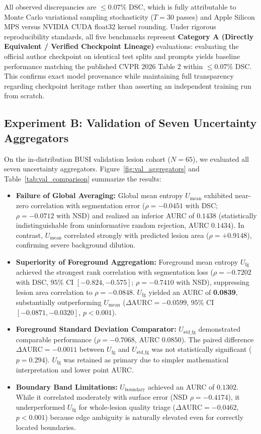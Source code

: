\documentclass[10pt,journal,compsoc]{IEEEtran}
\begin{document}
All observed discrepancies are $\le 0.07\%$ DSC, which is fully attributable to Monte Carlo variational sampling stochasticity ($T=30$ passes) and Apple Silicon MPS versus NVIDIA CUDA float32 kernel rounding. Under rigorous reproducibility standards, all five benchmarks represent \textbf{Category A (Directly Equivalent / Verified Checkpoint Lineage)} evaluations: evaluating the official author checkpoint on identical test splits and prompts yields baseline performance matching the published CVPR 2026 Table 2 within $\le 0.07\%$ DSC. This confirms exact model provenance while maintaining full transparency regarding checkpoint heritage rather than asserting an independent training run from scratch.

\subsection{Experiment B: Validation of Seven Uncertainty Aggregators}
On the in-distribution BUSI validation lesion cohort ($N=65$), we evaluated all seven uncertainty aggregators. Figure~\ref{fig:val_aggregators} and Table~\ref{tab:val_comparison} summarize the results:
\begin{itemize}
    \item \textbf{Failure of Global Averaging:} Global mean entropy $U_{\mathrm{mean}}$ exhibited near-zero correlation with segmentation error ($\rho = -0.0451$ with DSC; $\rho = -0.0712$ with NSD) and realized an inferior AURC of $0.1438$ (statistically indistinguishable from uninformative random rejection, AURC $0.1434$). In contrast, $U_{\mathrm{mean}}$ correlated strongly with predicted lesion area ($\rho = +0.9148$), confirming severe background dilution.
    \item \textbf{Superiority of Foreground Aggregation:} Foreground mean entropy $U_{\mathrm{fg}}$ achieved the strongest rank correlation with segmentation loss ($\rho = -0.7202$ with DSC, $95\%$ CI $[-0.824, -0.575]$; $\rho = -0.7410$ with NSD), suppressing lesion area correlation to $\rho = -0.0848$. $U_{\mathrm{fg}}$ yielded an AURC of \textbf{0.0839}, substantially outperforming $U_{\mathrm{mean}}$ ($\Delta\mathrm{AURC} = -0.0599$, $95\%$ CI $[-0.0871, -0.0320]$, $p < 0.001$).
    \item \textbf{Foreground Standard Deviation Comparator:} $U_{\mathrm{std\_fg}}$ demonstrated comparable performance ($\rho = -0.7068$, AURC $0.0850$). The paired difference $\Delta\mathrm{AURC} = -0.0011$ between $U_{\mathrm{fg}}$ and $U_{\mathrm{std\_fg}}$ was not statistically significant ($p = 0.294$). $U_{\mathrm{fg}}$ was retained as primary due to simpler mathematical interpretation and lower point AURC.
    \item \textbf{Boundary Band Limitations:} $U_{\mathrm{boundary}}$ achieved an AURC of $0.1302$. While it correlated moderately with surface error (NSD $\rho = -0.4174$), it underperformed $U_{\mathrm{fg}}$ for whole-lesion quality triage ($\Delta\mathrm{AURC} = -0.0462$, $p < 0.001$) because edge ambiguity is naturally elevated even for correctly located boundaries.
\end{itemize}
\end{document}
